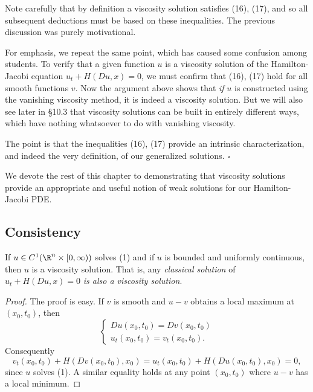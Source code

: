 \begin{remark}
\label{rem:viscosity-solution-definition-emphasis}
Note carefully that by definition a viscosity solution satisfies (16), (17), and so all subsequent deductions must be based on these inequalities. The previous discussion was purely motivational.

For emphasis, we repeat the same point, which has caused some confusion among students. To verify that a given function $u$ is a viscosity solution of the Hamilton-Jacobi equation $u_t + H(Du, x) = 0$, we must confirm that (16), (17) hold for all smooth functions $v$. Now the argument above shows that \textit{if} $u$ is constructed using the vanishing viscosity method, it is indeed a viscosity solution. But we will also see later in \S10.3 that viscosity solutions can be built in entirely different ways, which have nothing whatsoever to do with vanishing viscosity.

The point is that the inequalities (16), (17) provide an intrinsic characterization, and indeed the very definition, of our generalized solutions. $\square$
\end{remark}

We devote the rest of this chapter to demonstrating that viscosity solutions provide an appropriate and useful notion of weak solutions for our Hamilton-Jacobi PDE.

\subsection{Consistency}

\begin{proposition}
\label{prop:classical-solutions-are-viscosity-solutions}
If $u \in C^1(\R^n \times [0,\infty))$ solves (1) and if $u$ is bounded and uniformly continuous, then $u$ is a viscosity solution. That is, any \textit{classical solution} of $u_t + H(Du,x) = 0$ \textit{is also a viscosity solution}.
\end{proposition}
\begin{proof}
The proof is easy. If $v$ is smooth and $u - v$ obtains a local maximum at $(x_0, t_0)$, then
\[
\begin{cases} Du(x_0,t_0) = Dv(x_0,t_0) \\ u_t(x_0,t_0) = v_t(x_0,t_0). \end{cases}
\]
Consequently
\[
v_t(x_0, t_0) + H(Dv(x_0, t_0), x_0) = u_t(x_0, t_0) + H(Du(x_0, t_0), x_0) = 0,
\]
since $u$ solves (1). A similar equality holds at any point $(x_0, t_0)$ where $u - v$ has a local minimum.
\end{proof}

